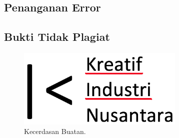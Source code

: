\subsection{Penanganan Error}

\subsection{Bukti Tidak Plagiat}
\begin{figure}[H]
	\includegraphics[width=8cm]{kreatiflogo.png}
	\centering
	\caption{Kecerdasan Buatan.}
\end{figure}